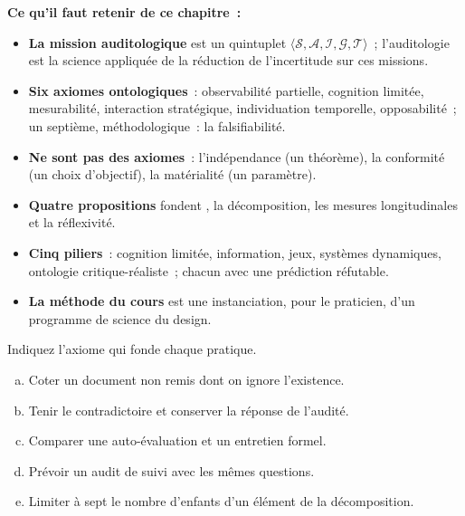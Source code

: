 \begin{boxresume}
\textbf{Ce qu'il faut retenir de ce chapitre~:}
\begin{itemize}
    \item \textbf{La mission auditologique} est un quintuplet
          $\langle \mathcal{S}, \mathcal{A}, \mathcal{I}, \mathcal{G},
          \mathcal{T} \rangle$~; l'auditologie est la science appliquée de
          la réduction de l'incertitude sur ces missions.
    \item \textbf{Six axiomes ontologiques}~: observabilité partielle,
          cognition limitée, mesurabilité, interaction stratégique,
          individuation temporelle, opposabilité~; un septième,
          méthodologique~: la falsifiabilité.
    \item \textbf{Ne sont pas des axiomes}~: l'indépendance (un théorème),
          la conformité (un choix d'objectif), la matérialité (un
          paramètre).
    \item \textbf{Quatre propositions} fondent \NEK{}, la décomposition, les
          mesures longitudinales et la réflexivité.
    \item \textbf{Cinq piliers}~: cognition limitée, information, jeux,
          systèmes dynamiques, ontologie critique-réaliste~; chacun avec une
          prédiction réfutable.
    \item \textbf{La méthode du cours} est une instanciation, pour le
          praticien, d'un programme de science du design.
\end{itemize}
\end{boxresume}

\bigskip

\begin{boxexo}[title={\ding{45}\quad Exercice~21.1. De la pratique à l'axiome \niveaubase}]
Indiquez l'axiome qui fonde chaque pratique.
\begin{enumerate}[(a)]
    \item Coter \NEK{} un document non remis dont on ignore l'existence.
    \item Tenir le contradictoire et conserver la réponse de l'audité.
    \item Comparer une auto-évaluation et un entretien formel.
    \item Prévoir un audit de suivi avec les mêmes questions.
    \item Limiter à sept le nombre d'enfants d'un élément de la
          décomposition.
\end{enumerate}
\end{boxexo}

